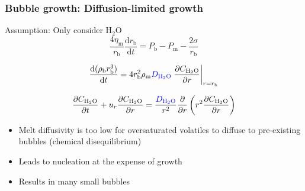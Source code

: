 \documentclass{beamer}
\begin{document}
\begin{frame}
  \frametitle{Bubble growth: Diffusion-limited growth}

  Assumption: Only consider H$_{2}$O \\
  
  $$ \frac{4 \eta_{\text{m}}}{r_{\text{b}}} \frac{\mathrm{d} r_{\text{b}}}{\mathrm{d} t} = P_{\text{b}} - P_{\text{m}} - \frac{2 \sigma}{r_{\text{b}}} $$

  $$ \frac{\mathrm{d} (\rho_{\text{b}} r_{\text{b}}^{3})}{\mathrm{d} t} = 4 r_{\text{b}}^{2} \rho_{\text{m}} \textcolor{blue}{D_{\text{H}_{2}\text{O}}} \left. \frac{\partial C_{\text{H}_{2}\text{O}}}{\partial r}\right|_{r = r_{\text{b}}}$$

  $$ \frac{\partial C_{\text{H}_{2}\text{O}}}{\partial t} + u_{r} \frac{\partial C_{\text{H}_{2}\text{O}}}{\partial r} = \frac{\textcolor{blue}{D_{\text{H}_{2}\text{O}}}}{r^{2}} \frac{\partial}{\partial r} \left( r^{2} \frac{\partial C_{\text{H}_{2}\text{O}}}{\partial r}\right)$$

  \begin{itemize}
  \item Melt diffusivity is too low for oversaturated volatiles to diffuse to pre-existing bubbles (chemical disequilibrium) \\
  \item Leads to nucleation at the expense of growth \\
  \item Results in many small bubbles \\
  \end{itemize}
    
\end{frame}
\end{document}
